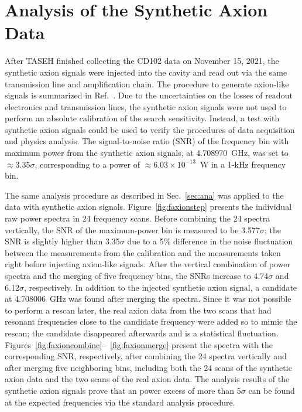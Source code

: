 \section{Analysis of the Synthetic Axion Data}\label{sec:faxion}
After TASEH finished collecting the CD102 data on November 15, 2021, 
the synthetic axion signals were injected into the cavity and read out via the 
same transmission line and amplification chain. The procedure 
to generate axion-like signals is summarized in 
Ref.~\cite{TASEHInstrumentation}. 
Due to the uncertainties on the losses of readout electronics and transmission
 lines, the synthetic axion signals were not used to perform an absolute 
calibration of the search sensitivity. Instead, 
a test with synthetic axion signals could be used to verify the procedures of 
data acquisition and physics analysis. The 
signal-to-noise ratio (SNR) of the frequency bin with maximum power from the 
synthetic axion signals, at 4.708970~GHz, was set to $\approx 3.35\sigma$, 
corresponding to a power of $\approx 6.03 \times 10^{-13}$~W in a 1-kHz 
frequency bin.  

The same analysis procedure as described in Sec.~\ref{sec:ana} was applied 
to the data with synthetic axion signals. 
Figure~\ref{fig:faxionstep} presents the individual raw power spectra in 
24 frequency scans. Before combining 
the 24 spectra vertically, the SNR of the maximum-power bin is measured to be 
3.577$\sigma$; the SNR is slightly higher than 3.35$\sigma$ due to a 
5\% difference in the noise fluctuation between the measurements from 
the calibration and the measurements taken 
right before injecting axion-like signals. After the vertical combination 
of power spectra and the merging of five frequency bins, the SNRs increase to 
4.74$\sigma$ and 6.12$\sigma$, respectively. In addition to the 
injected synthetic axion signal, a candidate at 4.708006~GHz was found after 
merging the spectra. Since it was not possible to perform a rescan later, 
the real axion data from the two scans that had resonant frequencies close to 
the candidate frequency were added so to mimic the rescan; the candidate 
 disappeared afterwards and is a statistical fluctuation.  
Figures~\ref{fig:faxioncombine}--~\ref{fig:faxionmerge} present 
the spectra with the corresponding SNR, respectively, after combining the 24 
spectra vertically and after merging five neighboring bins, 
including both the 24 scans of the synthetic axion data and the two scans 
of the real axion data. 
The analysis results of the synthetic axion signals prove that an power 
excess of more than 5$\sigma$ can be found at the expected frequencies via 
the standard analysis procedure.  

